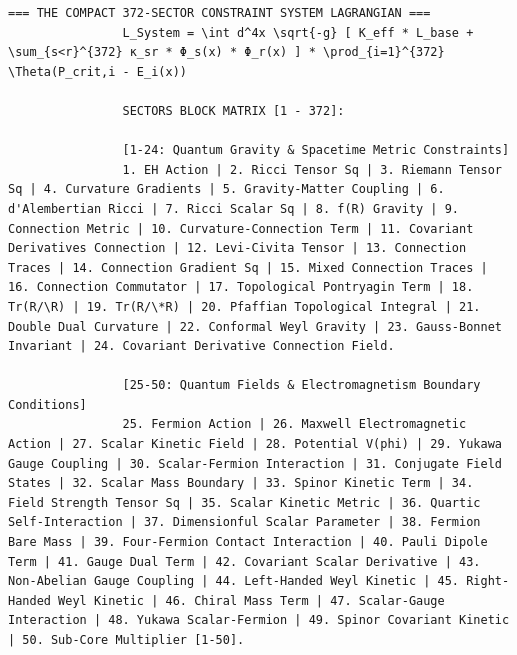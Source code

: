 \documentclass[12pt,a4paper]{article}
\makeatletter
\def\ttfamily{\@noligs\fontfamily\ttdefault\selectfont\sloppy}
\makeatother
\begin{document}
\begin{tcolorbox}
\begin{otherlanguage}{english}
\begin{lstlisting}[basicstyle=\scriptsize\ttfamily, breaklines=true, columns=fullflexible]
				=== THE COMPACT 372-SECTOR CONSTRAINT SYSTEM LAGRANGIAN ===
				L_System = \int d^4x \sqrt{-g} [ K_eff * L_base + \sum_{s<r}^{372} κ_sr * Φ_s(x) * Φ_r(x) ] * \prod_{i=1}^{372} \Theta(P_crit,i - E_i(x))
				
				SECTORS BLOCK MATRIX [1 - 372]:
				
				[1-24: Quantum Gravity & Spacetime Metric Constraints]
				1. EH Action | 2. Ricci Tensor Sq | 3. Riemann Tensor Sq | 4. Curvature Gradients | 5. Gravity-Matter Coupling | 6. d'Alembertian Ricci | 7. Ricci Scalar Sq | 8. f(R) Gravity | 9. Connection Metric | 10. Curvature-Connection Term | 11. Covariant Derivatives Connection | 12. Levi-Civita Tensor | 13. Connection Traces | 14. Connection Gradient Sq | 15. Mixed Connection Traces | 16. Connection Commutator | 17. Topological Pontryagin Term | 18. Tr(R/\R) | 19. Tr(R/\*R) | 20. Pfaffian Topological Integral | 21. Double Dual Curvature | 22. Conformal Weyl Gravity | 23. Gauss-Bonnet Invariant | 24. Covariant Derivative Connection Field.
				
				[25-50: Quantum Fields & Electromagnetism Boundary Conditions]
				25. Fermion Action | 26. Maxwell Electromagnetic Action | 27. Scalar Kinetic Field | 28. Potential V(phi) | 29. Yukawa Gauge Coupling | 30. Scalar-Fermion Interaction | 31. Conjugate Field States | 32. Scalar Mass Boundary | 33. Spinor Kinetic Term | 34. Field Strength Tensor Sq | 35. Scalar Kinetic Metric | 36. Quartic Self-Interaction | 37. Dimensionful Scalar Parameter | 38. Fermion Bare Mass | 39. Four-Fermion Contact Interaction | 40. Pauli Dipole Term | 41. Gauge Dual Term | 42. Covariant Scalar Derivative | 43. Non-Abelian Gauge Coupling | 44. Left-Handed Weyl Kinetic | 45. Right-Handed Weyl Kinetic | 46. Chiral Mass Term | 47. Scalar-Gauge Interaction | 48. Yukawa Scalar-Fermion | 49. Spinor Covariant Kinetic | 50. Sub-Core Multiplier [1-50].
				

\end{lstlisting}
\end{otherlanguage}
\end{tcolorbox}
\end{document}
